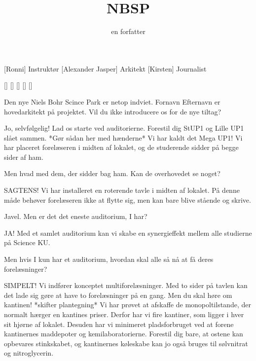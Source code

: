 \documentclass[a4paper,11pt]{article}
\title{NBSP}
\author{en forfatter}
\begin{document}
\maketitle

\begin{roles}
[Ronni] Instruktør
[Alexander Jasper] Arkitekt
[Kirsten] Journalist
\end{roles}

\begin{props}
[]
[]
[]
[]
[]
\end{props}

\begin{sketch}


 Den nye Niels Bohr Scince Park er netop indviet. Fornavn Efternavn er hovedarkitekt på projektet. Vil du ikke introducere os for de nye tiltag?

 Jo, selvfølgelig! Lad os starte ved auditorierne. Forestil dig StUP1 og Lille UP1 slået sammen. *Gør sådan her med hænderne* Vi har kaldt det Mega UP1! Vi har placeret forelæseren i midten af lokalet, og de studerende sidder på begge sider af ham.

 Men hvad med dem, der sidder bag ham. Kan de overhovedet se noget?

 SAGTENS! Vi har installeret en roterende tavle i midten af lokalet. På denne måde behøver forelæseren ikke at flytte sig, men kan bare blive stående og skrive.

 Javel. Men er det det eneste auditorium, I har?

 JA! Med et samlet auditorium kan vi skabe en synergieffekt mellem alle studierne på Science KU.

 Men hvis I kun har et auditorium, hvordan skal alle så nå at få deres forelæsninger?

 SIMPELT! Vi indfører konceptet multiforelæsninger. Med to sider på tavlen kan det lade sig gøre at have to forelæsninger på en gang. Men du skal høre om kantinen! *skifter plantegning* Vi har prøvet at afskaffe de monopoltilstande, der normalt hærger en kantines priser. Derfor har vi fire kantiner, som ligger i hver sit hjørne af lokalet. Desuden har vi minimeret pladsforbruget ved at forene kantinernes maddepoter og kemilaboratorierne. Forestil dig bare, at ostene kan opbevares stinkskabet, og kantinernes køleskabe kan jo også bruges til sølvnitrat og nitroglycerin.


\end{sketch}
\end{document}
